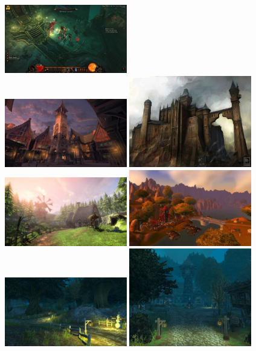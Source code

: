 \documentclass{article}
\begin{document}
\includegraphics[width=0.4\textwidth]{d3_boss.jpg}
\\
\includegraphics[width=0.4\textwidth]{bowerstone.jpg}
\includegraphics[width=0.4\textwidth]{bowerstone_castle.jpg}
\\
\includegraphics[width=0.4\textwidth]{fable2_farm.jpg}
\includegraphics[width=0.4\textwidth]{redridge.jpg}
\\
\includegraphics[width=0.4\textwidth]{duskwood_road.jpg}
\includegraphics[width=0.4\textwidth]{duskwood_town.jpg}
\end{document}
